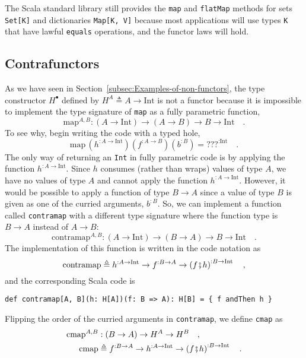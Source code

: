 The Scala standard library still provides the \lstinline!map! and
\lstinline!flatMap! methods for sets \lstinline!Set[K]! and dictionaries
\lstinline!Map[K, V]! because most applications will use types \lstinline!K!
that have lawful \lstinline!equals! operations, and the functor laws
will hold.

\subsection{Contrafunctors\label{subsec:Contrafunctors}}

As we have seen in Section~\ref{subsec:Examples-of-non-functors},
the type constructor $H^{\bullet}$ defined by $H^{A}\triangleq A\rightarrow\text{Int}$
is not a functor because it is impossible to implement the type signature
of \lstinline!map! as a fully parametric function,
\[
\text{map}^{A,B}:\left(A\rightarrow\text{Int}\right)\rightarrow\left(A\rightarrow B\right)\rightarrow B\rightarrow\text{Int}\quad.
\]
To see why, begin writing the code with a typed hole, 
\[
\text{map}\,(h^{:A\rightarrow\text{Int}})(f^{:A\rightarrow B})(b^{:B})=\text{???}^{:\text{Int}}\quad.
\]
The only way of returning an \lstinline!Int! in fully parametric
code is by applying the function $h^{:A\rightarrow\text{Int}}$. Since
$h$ consumes (rather than wraps) values of type $A$, we have no
values of type $A$ and cannot apply the function $h^{:A\rightarrow\text{Int}}$.
However, it would be possible to apply a function of type $B\rightarrow A$
since a value of type $B$ is given as one of the curried arguments,
$b^{:B}$. So, we can implement a function called \lstinline!contramap!
with a different type signature where the function type is $B\rightarrow A$
instead of $A\rightarrow B$: 
\[
\text{contramap}^{A,B}:\left(A\rightarrow\text{Int}\right)\rightarrow\left(B\rightarrow A\right)\rightarrow B\rightarrow\text{Int}\quad.
\]
The implementation of this function is written in the code notation
as
\[
\text{contramap}\triangleq h^{:A\rightarrow\text{Int}}\rightarrow f^{:B\rightarrow A}\rightarrow\left(f\bef h\right)^{:B\rightarrow\text{Int}}\quad,
\]
and the corresponding Scala code is
\begin{lstlisting}
def contramap[A, B](h: H[A])(f: B => A): H[B] = { f andThen h }
\end{lstlisting}
Flipping the order of the curried arguments in \lstinline!contramap!,
we define \lstinline!cmap! as
\begin{align}
\text{cmap}^{A,B} & :\left(B\rightarrow A\right)\rightarrow H^{A}\rightarrow H^{B}\quad,\nonumber \\
\text{cmap} & \triangleq f^{:B\rightarrow A}\rightarrow h^{:A\rightarrow\text{Int}}\rightarrow\left(f\bef h\right)^{:B\rightarrow\text{Int}}\quad.\label{eq:f-example-1-contrafmap}
\end{align}
